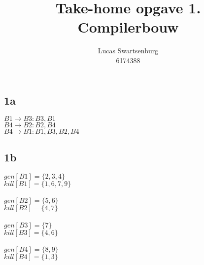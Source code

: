 \documentclass[10pt,a4paper]{article}
\author{Lucas Swartsenburg\\6174388}
\title{Take-home opgave 1. Compilerbouw}
\begin{document}
\maketitle


\subsection*{1a}
$B1 \rightarrow B3:{B3,B1}$ \\
$B4 \rightarrow B2:{B2,B4}$ \\
$B4 \rightarrow B1:{B1,B3,B2,B4}$

\subsection*{1b}
$gen[B1]= \{2,3,4\} $\\
$kill[B1]= \{1,6,7,9\} $\\
\\
$gen[B2]= \{5,6\} $\\
$kill[B2]= \{4,7\} $\\
\\
$gen[B3]= \{7\} $\\
$kill[B3]= \{4,6\} $\\
\\
$gen[B4]= \{8,9\} $\\
$kill[B4]= \{1,3\} $\\
\end{document}
